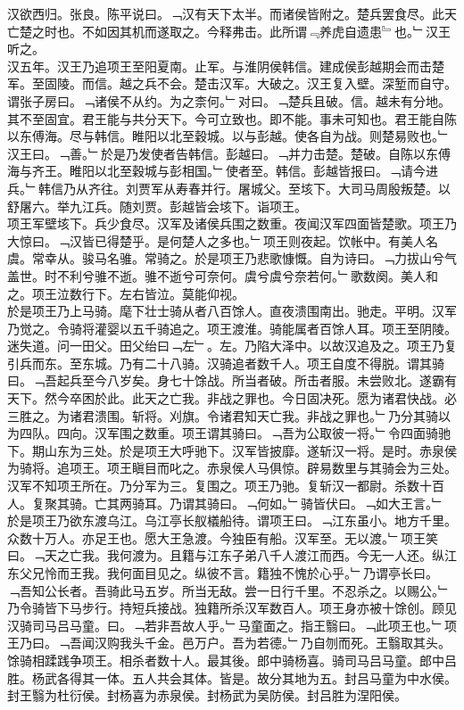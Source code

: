 \documentclass{zhvt-classic}
\begin{document}
\hspace*{2em}汉欲西归。张良。陈平说曰。﹁汉有天下太半。而诸侯皆附之。楚兵罢食尽。此天亡楚之时也。不如因其机而遂取之。今释弗击。此所谓﹃养虎自遗患﹄也。﹂汉王听之。\\
\hspace*{2em}汉五年。汉王乃追项王至阳夏南。止军。与淮阴侯韩信。建成侯彭越期会而击楚军。至固陵。而信。越之兵不会。楚击汉军。大破之。汉王复入壁。深堑而自守。谓张子房曰。﹁诸侯不从约。为之柰何。﹂对曰。﹁楚兵且破。信。越未有分地。其不至固宜。君王能与共分天下。今可立致也。即不能。事未可知也。君王能自陈以东傅海。尽与韩信。睢阳以北至穀城。以与彭越。使各自为战。则楚易败也。﹂汉王曰。﹁善。﹂於是乃发使者告韩信。彭越曰。﹁并力击楚。楚破。自陈以东傅海与齐王。睢阳以北至穀城与彭相国。﹂使者至。韩信。彭越皆报曰。﹁请今进兵。﹂韩信乃从齐往。刘贾军从寿春并行。屠城父。至垓下。大司马周殷叛楚。以舒屠六。举九江兵。随刘贾。彭越皆会垓下。诣项王。\\
\hspace*{2em}项王军壁垓下。兵少食尽。汉军及诸侯兵围之数重。夜闻汉军四面皆楚歌。项王乃大惊曰。﹁汉皆已得楚乎。是何楚人之多也。﹂项王则夜起。饮帐中。有美人名虞。常幸从。骏马名骓。常骑之。於是项王乃悲歌慷慨。自为诗曰。﹁力拔山兮气盖世。时不利兮骓不逝。骓不逝兮可奈何。虞兮虞兮奈若何。﹂歌数阕。美人和之。项王泣数行下。左右皆泣。莫能仰视。\\
\hspace*{2em}於是项王乃上马骑。麾下壮士骑从者八百馀人。直夜溃围南出。驰走。平明。汉军乃觉之。令骑将灌婴以五千骑追之。项王渡淮。骑能属者百馀人耳。项王至阴陵。迷失道。问一田父。田父绐曰﹁左﹂。左。乃陷大泽中。以故汉追及之。项王乃复引兵而东。至东城。乃有二十八骑。汉骑追者数千人。项王自度不得脱。谓其骑曰。﹁吾起兵至今八岁矣。身七十馀战。所当者破。所击者服。未尝败北。遂霸有天下。然今卒困於此。此天之亡我。非战之罪也。今日固决死。愿为诸君快战。必三胜之。为诸君溃围。斩将。刈旗。令诸君知天亡我。非战之罪也。﹂乃分其骑以为四队。四向。汉军围之数重。项王谓其骑曰。﹁吾为公取彼一将。﹂令四面骑驰下。期山东为三处。於是项王大呼驰下。汉军皆披靡。遂斩汉一将。是时。赤泉侯为骑将。追项王。项王瞋目而叱之。赤泉侯人马俱惊。辟易数里与其骑会为三处。汉军不知项王所在。乃分军为三。复围之。项王乃驰。复斩汉一都尉。杀数十百人。复聚其骑。亡其两骑耳。乃谓其骑曰。﹁何如。﹂骑皆伏曰。﹁如大王言。﹂\\
\hspace*{2em}於是项王乃欲东渡乌江。乌江亭长舣檥船待。谓项王曰。﹁江东虽小。地方千里。众数十万人。亦足王也。愿大王急渡。今独臣有船。汉军至。无以渡。﹂项王笑曰。﹁天之亡我。我何渡为。且籍与江东子弟八千人渡江而西。今无一人还。纵江东父兄怜而王我。我何面目见之。纵彼不言。籍独不愧於心乎。﹂乃谓亭长曰。﹁吾知公长者。吾骑此马五岁。所当无敌。尝一日行千里。不忍杀之。以赐公。﹂乃令骑皆下马步行。持短兵接战。独籍所杀汉军数百人。项王身亦被十馀创。顾见汉骑司马吕马童。曰。﹁若非吾故人乎。﹂马童面之。指王翳曰。﹁此项王也。﹂项王乃曰。﹁吾闻汉购我头千金。邑万户。吾为若德。﹂乃自刎而死。王翳取其头。馀骑相蹂践争项王。相杀者数十人。最其後。郎中骑杨喜。骑司马吕马童。郎中吕胜。杨武各得其一体。五人共会其体。皆是。故分其地为五。封吕马童为中水侯。封王翳为杜衍侯。封杨喜为赤泉侯。封杨武为吴防侯。封吕胜为涅阳侯。\\
\end{document}
